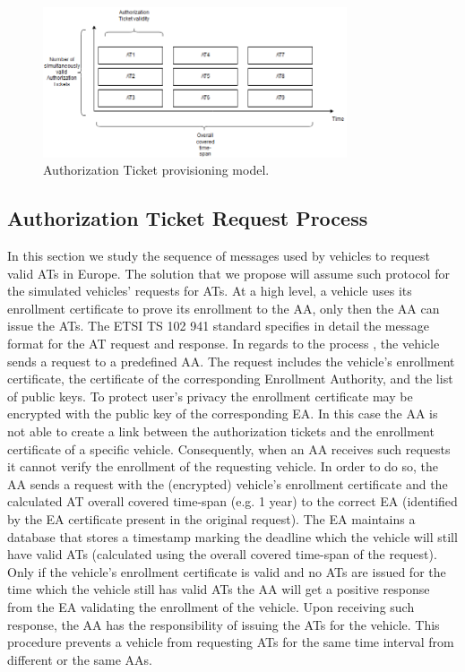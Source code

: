 \begin{figure}
	\centering
	\includegraphics[width=0.8\textwidth]{Figures/AT_P.png}
	\caption{\label{fig:AT_P}Authorization Ticket provisioning model.}
\end{figure}

\subsection{Authorization Ticket Request Process} \label{auth_process}
In this section we study the sequence of messages used by vehicles to request valid ATs in Europe. The solution that we propose will assume such protocol for the simulated vehicles' requests for ATs.
At a high level, a vehicle uses its enrollment certificate to prove its enrollment to the AA, only then the AA can issue the ATs.
The ETSI TS 102 941 \cite{etsi_privacy} standard specifies in detail the message format for the AT request and response. In regards to the process \cite{generic_eu}, the vehicle sends a request to a predefined AA. The request includes the vehicle's enrollment certificate, the certificate of the corresponding Enrollment Authority, and the list of public keys. To protect user's privacy the enrollment certificate may be encrypted with the public key of the corresponding EA. In this case the AA is not able to create a link between the authorization tickets and the enrollment certificate of a specific vehicle. Consequently, when an AA receives such requests it cannot verify the enrollment of the requesting vehicle. In order to do so, the AA sends a request with the (encrypted) vehicle's enrollment certificate and the calculated AT overall covered time-span (e.g. 1 year) to the correct EA (identified by the EA certificate present in the original request). The EA maintains a database that stores a timestamp marking the deadline which the vehicle will still have valid ATs (calculated using the overall covered time-span of the request). Only if the vehicle's enrollment certificate is valid and no ATs are issued for the time which the vehicle still has valid ATs the AA will get a positive response from the EA validating the enrollment of the vehicle. Upon receiving such response, the AA has the responsibility of issuing the ATs for the vehicle. This procedure prevents a vehicle from requesting ATs for the same time interval from different or the same AAs.


